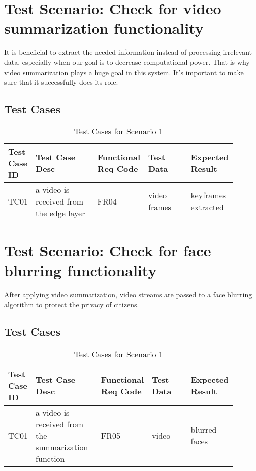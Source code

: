 \documentclass[12pt]{article}
\begin{document}
\section{Test Scenario: Check for video summarization functionality}\label{sec:TSy}
It is beneficial to extract the needed information instead of processing irrelevant data, especially when our goal is to decrease computational power. That is why video summarization plays a huge goal in this system. It's important to make sure that it successfully does its role.
\subsection{Test Cases}
\begin{table}[h]
\caption{Test Cases for Scenario 1}
\label{tab:TC1}
\begin{tabular}{|p{0.1\linewidth}|p{0.3\linewidth}|p{0.1\linewidth}|p{0.2\linewidth}|p{0.2\linewidth}|}
\hline
Test Case ID & Test Case Desc & Functional Req Code & Test Data & Expected Result \\ \hline
TC01  & a video is received from the edge layer & FR04 &  video frames   &  keyframes extracted                \\ \hline

\end{tabular}
\end{table}

\newpage
\section{Test Scenario: Check for face blurring functionality}\label{sec:TSy}
After applying video summarization, video streams are passed to a face blurring algorithm to protect the privacy of citizens.
\subsection{Test Cases}
\begin{table}[h]
\caption{Test Cases for Scenario 1}
\label{tab:TC1}
\begin{tabular}{|p{0.1\linewidth}|p{0.3\linewidth}|p{0.1\linewidth}|p{0.2\linewidth}|p{0.2\linewidth}|}
\hline
Test Case ID & Test Case Desc & Functional Req Code & Test Data & Expected Result \\ \hline
TC01  & a video is received from the summarization function & FR05 &  video   &  blurred faces                \\ \hline

\end{tabular}
\end{table}
\end{document}
